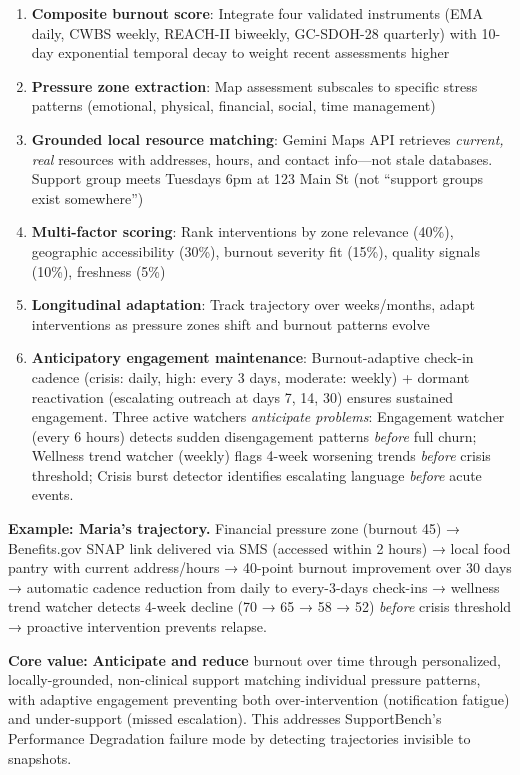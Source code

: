 \documentclass{article}
\begin{document}
\begin{enumerate}
    \item \textbf{Composite burnout score}: Integrate four validated instruments (EMA daily, CWBS weekly, REACH-II biweekly, GC-SDOH-28 quarterly) with 10-day exponential temporal decay to weight recent assessments higher
    \item \textbf{Pressure zone extraction}: Map assessment subscales to specific stress patterns (emotional, physical, financial, social, time management)
    \item \textbf{Grounded local resource matching}: Gemini Maps API retrieves \textit{current, real} resources with addresses, hours, and contact info—not stale databases. Support group meets Tuesdays 6pm at 123 Main St (not ``support groups exist somewhere'')
    \item \textbf{Multi-factor scoring}: Rank interventions by zone relevance (40\%), geographic accessibility (30\%), burnout severity fit (15\%), quality signals (10\%), freshness (5\%)
    \item \textbf{Longitudinal adaptation}: Track trajectory over weeks/months, adapt interventions as pressure zones shift and burnout patterns evolve
    \item \textbf{Anticipatory engagement maintenance}: Burnout-adaptive check-in cadence (crisis: daily, high: every 3 days, moderate: weekly) + dormant reactivation (escalating outreach at days 7, 14, 30) ensures sustained engagement. Three active watchers \textit{anticipate problems}: Engagement watcher (every 6 hours) detects sudden disengagement patterns \textit{before} full churn; Wellness trend watcher (weekly) flags 4-week worsening trends \textit{before} crisis threshold; Crisis burst detector identifies escalating language \textit{before} acute events.
\end{enumerate}

\textbf{Example: Maria's trajectory.} Financial pressure zone (burnout 45) → Benefits.gov SNAP link delivered via SMS (accessed within 2 hours) → local food pantry with current address/hours → 40-point burnout improvement over 30 days → automatic cadence reduction from daily to every-3-days check-ins → wellness trend watcher detects 4-week decline (70 → 65 → 58 → 52) \textit{before} crisis threshold → proactive intervention prevents relapse.

\textbf{Core value:} \textbf{Anticipate and reduce} burnout over time through personalized, locally-grounded, non-clinical support matching individual pressure patterns, with adaptive engagement preventing both over-intervention (notification fatigue) and under-support (missed escalation). This addresses SupportBench's Performance Degradation failure mode by detecting trajectories invisible to snapshots.
\end{document}
